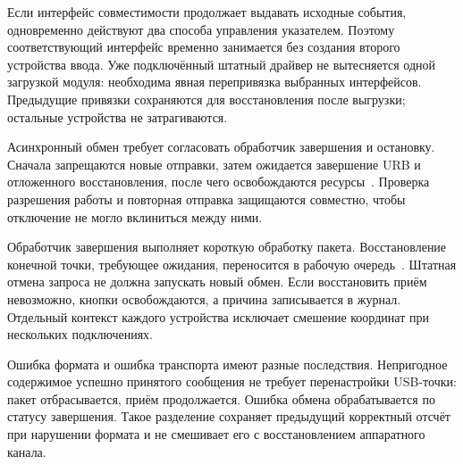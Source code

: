 Если интерфейс совместимости продолжает выдавать исходные события, одновременно действуют два способа управления указателем. Поэтому соответствующий интерфейс временно занимается без создания второго устройства ввода. Уже подключённый штатный драйвер не вытесняется одной загрузкой модуля: необходима явная перепривязка выбранных интерфейсов. Предыдущие привязки сохраняются для восстановления после выгрузки; остальные устройства не затрагиваются.

Асинхронный обмен требует согласовать обработчик завершения и остановку. Сначала запрещаются новые отправки, затем ожидается завершение URB и отложенного восстановления, после чего освобождаются ресурсы~\cite{ldd3,love3}. Проверка разрешения работы и повторная отправка защищаются совместно, чтобы отключение не могло вклиниться между ними.

Обработчик завершения выполняет короткую обработку пакета. Восстановление конечной точки, требующее ожидания, переносится в рабочую очередь~\cite{kernelurb}. Штатная отмена запроса не должна запускать новый обмен. Если восстановить приём невозможно, кнопки освобождаются, а причина записывается в журнал. Отдельный контекст каждого устройства исключает смешение координат при нескольких подключениях.

Ошибка формата и ошибка транспорта имеют разные последствия. Непригодное содержимое успешно принятого сообщения не требует перенастройки USB-точки: пакет отбрасывается, приём продолжается. Ошибка обмена обрабатывается по статусу завершения. Такое разделение сохраняет предыдущий корректный отсчёт при нарушении формата и не смешивает его с восстановлением аппаратного канала.

\clearpage
